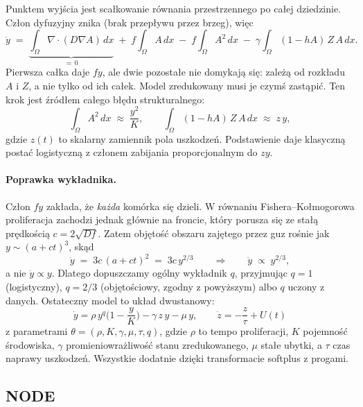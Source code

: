 \documentclass[11pt,a4paper]{article}
\begin{document}
Punktem wyjścia jest scałkowanie równania przestrzennego po całej dziedzinie. Człon
dyfuzyjny znika (brak przepływu przez brzeg), więc
\begin{equation}
\dot y \;=\; \underbrace{\int_\Omega \nabla\!\cdot\!(D\nabla A)\,dx}_{=\,0}
\;+\; f\!\int_\Omega A\,dx \;-\; f\!\int_\Omega A^2\,dx
\;-\; \gamma\!\int_\Omega (1-hA)\,Z\,A\,dx .
\label{eq:redukcja}
\end{equation}
Pierwsza całka daje $f y$, ale dwie pozostałe nie domykają się: zależą od
rozkładu $A$ i $Z$, a nie tylko od ich całek. Model zredukowany musi je czymś
zastąpić. Ten krok jest źródłem całego błędu strukturalnego:
\begin{equation}
\int_\Omega A^2\,dx \;\approx\; \frac{y^2}{K},
\qquad
\int_\Omega (1-hA)\,Z\,A\,dx \;\approx\; z\,y ,
\end{equation}
gdzie $z(t)$ to skalarny zamiennik pola uszkodzeń. Podstawienie daje klasyczną postać
logistyczną z członem zabijania proporcjonalnym do $z y$.

\paragraph{Poprawka wykładnika.} Człon $f y$ zakłada, że \emph{każda} komórka się dzieli.
W równaniu Fishera--Kołmogorowa proliferacja zachodzi jednak głównie na froncie, który
porusza się ze stałą prędkością $c = 2\sqrt{Df}$. Zatem objętość obszaru zajętego przez guz rośnie jak $y \sim (a+ct)^3$, skąd
\begin{equation}
\dot y \;=\; 3c\,(a+ct)^2 \;=\; 3c\,y^{2/3}
\qquad\Longrightarrow\qquad
\dot y \;\propto\; y^{2/3},
\end{equation}
a nie $\dot y \propto y$. Dlatego dopuszczamy ogólny wykładnik $q$, przyjmując
$q=1$ (logistyczny), $q=2/3$ (objętościowy, zgodny z powyższym) albo
$q$ uczony z danych. Ostateczny model to układ dwustanowy:
\begin{equation}
\boxed{\;
\dot y = \rho\,y^{q}\Big(1-\frac{y}{K}\Big) - \gamma\,z\,y - \mu\,y ,
\qquad
\dot z = -\frac{z}{\tau} + U(t) \; }
\label{eq:ode}
\end{equation}
z parametrami $\theta=(\rho,K,\gamma,\mu,\tau,q)$, gdzie $\rho$ to tempo proliferacji,
$K$ pojemność środowiska, $\gamma$ promieniowrażliwość stanu zredukowanego, $\mu$ stałe
ubytki, a $\tau$ czas naprawy uszkodzeń. Wszystkie dodatnie dzięki
transformacie softplus z progami.

\subsection{NODE}
\label{sec:model-node}
\end{document}
